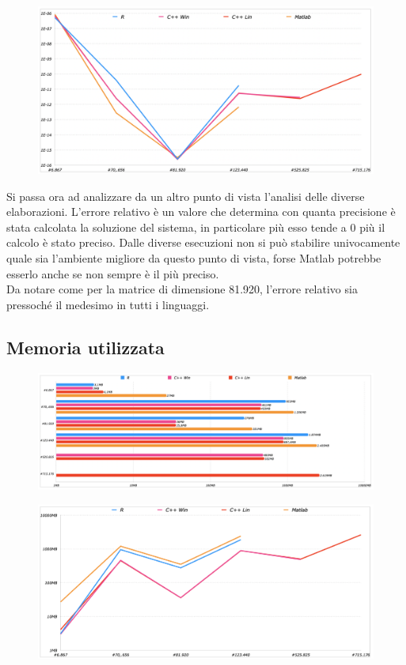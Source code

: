 \documentclass[preprint,12pt]{elsarticle}
\begin{document}
\begin{figure}[H]
	\centering
	\includegraphics[width=\linewidth]{errore2}
\end{figure}

Si passa ora ad analizzare da un altro punto di vista l'analisi delle diverse elaborazioni. L'errore relativo è un valore che determina con quanta precisione è stata calcolata la soluzione del sistema, in particolare più esso tende a 0 più il calcolo è stato preciso.
Dalle diverse esecuzioni non si può stabilire univocamente quale sia l'ambiente migliore da questo punto di vista, forse Matlab potrebbe esserlo anche se non sempre è il più preciso.\\
Da notare come per la matrice di dimensione 81.920, l'errore relativo sia pressoché il medesimo in tutti i linguaggi.

\subsection{Memoria utilizzata}

\begin{figure}[H]
	\centering
	\includegraphics[width=\linewidth]{memoria1}
\end{figure}

\begin{figure}[H]
	\centering
	\includegraphics[width=\linewidth]{memoria2}
\end{figure}
\end{document}
